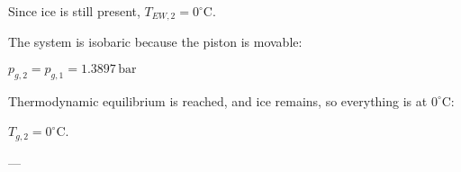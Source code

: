 Since ice is still present, \( T_{EW,2} = 0^\circ \text{C} \).  

The system is isobaric because the piston is movable:  

\( p_{g,2} = p_{g,1} = 1.3897 \, \text{bar} \)  

Thermodynamic equilibrium is reached, and ice remains, so everything is at \( 0^\circ \text{C} \):  

\( T_{g,2} = 0^\circ \text{C} \).  

---